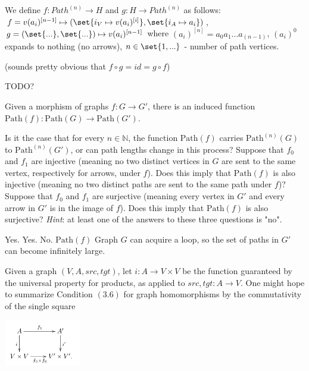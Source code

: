 \documentclass{article}
\begin{document}
We define $f: Path^{(n)} \to H$ and $g:H \to Path^{(n)}$ as follows: $f = v
(a_i)^{[n-1]} \mapsto (\set{i_V \mapsto v(a_i)^{[i]}}, \set{i_A \mapsto a_i})$, $g
= (\set{...}, \set{...}) \mapsto v(a_i)^{[n-1]}$ where $(a_i)^{[n]} = a_0 a_1 ...
a_{(n-1)}$, $(a_i)^0$ expands to nothing (no arrows), $n \in \set{1,...}$ -
number of path vertices.

(sounds pretty obvious that $f\circ g = id = g \circ f$)

TODO?


 Given a morphism of graphs $f : G \to G'$, there is an
induced function $\text{Path}(f) : \text{Path}(G) \to \text{Path}(G')$.

\es Is it the case that for every $n \in \mathbb{N}$, the function
    $\text{Path}(f)$ carries $\text{Path}^{(n)}(G)$ to $\text{Path}^{(n)}(G')$,
    or can path lengths change in this process?
\ei Suppose that $f_0$ and $f_1$ are injective (meaning no two distinct vertices in
    $G$ are sent to the same vertex, respectively for arrows, under $f$). Does this
    imply that $\text{Path}(f)$ is also injective (meaning no two distinct paths are
    sent to the same path under $f$)?
\ei Suppose that $f_0$ and $f_1$ are surjective (meaning every vertex in $G'$ and
    every arrow in $G'$ is in the image of $f$). Does this imply that
    $\text{Path}(f)$ is also surjective? \textit{Hint}: at least one of the
    answers to these three questions is "no".
\ee


\ans

\es Yes.
\ei Yes.
\ei No. $\text{Path}(f)$ Graph $G$ can acquire a loop, so the set of paths in
    $G'$ can become infinitely large.
\ee



Given a graph $(V, A, \textit{src}, \textit{tgt})$, let $i : A \to V \times V$
be the function guaranteed by the universal property for products, as applied to
$\textit{src}, \textit{tgt} : A \to V$. One might hope to summarize Condition
$(3.6)$ for graph homomorphisms by the commutativity of the single square

\begin{center}
\includegraphics[width=0.25\textwidth]{img/commsquare.png}
\end{center}
\end{document}
